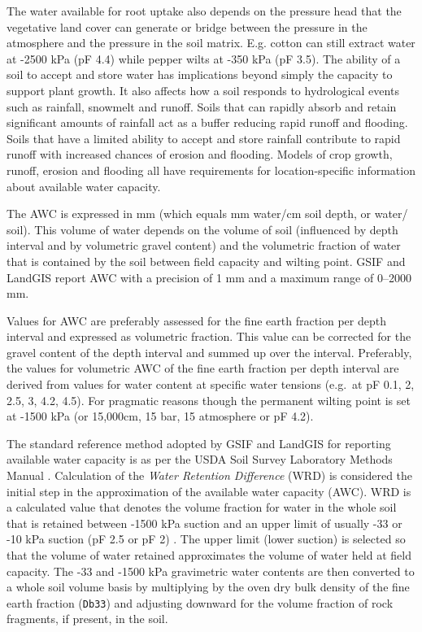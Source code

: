 \documentclass[graybox,natbib,nospthms,UStrade]{svmono}
\begin{document}
The water available for root uptake also depends on the pressure head
that the vegetative land cover can generate or bridge between the
pressure in the atmosphere and the pressure in the soil matrix. E.g.
cotton can still extract water at -2500 kPa (pF 4.4) while pepper wilts at -350 kPa (pF
3.5). The ability of a soil to accept and store water has implications
beyond simply the capacity to support plant growth. It also affects how
a soil responds to hydrological events such as rainfall, snowmelt and
runoff. Soils that can rapidly absorb and retain significant amounts of
rainfall act as a buffer reducing rapid runoff and flooding. Soils that
have a limited ability to accept and store rainfall contribute to rapid
runoff with increased chances of erosion and flooding. Models of crop
growth, runoff, erosion and flooding all have requirements for
location-specific information about available water capacity.

The AWC is expressed in mm (which equals mm water/cm soil depth, or
water/ soil). This volume of water depends on the volume of soil
(influenced by depth interval and by volumetric gravel content) and the
volumetric fraction of water that is contained by the soil between field
capacity and wilting point. GSIF and LandGIS report AWC with a precision of 1 mm
and a maximum range of 0--2000 mm.

Values for AWC are preferably assessed for the fine earth fraction per
depth interval and expressed as volumetric fraction. This value can be
corrected for the gravel content of the depth interval and summed up
over the interval. Preferably, the values for volumetric AWC of the fine
earth fraction per depth interval are derived from values for water
content at specific water tensions (e.g.~at pF 0.1, 2, 2.5, 3, 4.2,
4.5). For pragmatic reasons though the permanent wilting point is set at
-1500 kPa (or 15,000cm, 15 bar, 15 atmosphere or pF 4.2).

The standard reference method adopted by GSIF and LandGIS for reporting available
water capacity is as per the USDA Soil Survey Laboratory Methods Manual
\citep[ p.137]{Burt2004SSIR}. Calculation of the \emph{Water Retention Difference}
(WRD) is considered the initial step in the approximation of the
available water capacity (AWC). WRD is a calculated value that denotes
the volume fraction for water in the whole soil that is retained between -1500 kPa suction and an upper limit of usually -33 or -10 kPa suction (pF 2.5 or pF 2)
\citep[ p.137]{Burt2004SSIR}. The upper limit (lower suction) is selected so
that the volume of water retained approximates the volume of water held
at field capacity. The -33 and -1500 kPa gravimetric water contents are then
converted to a whole soil volume basis by multiplying by the oven dry
bulk density of the fine earth fraction (\texttt{Db33}) and adjusting downward
for the volume fraction of rock fragments, if present, in the soil.
\end{document}
